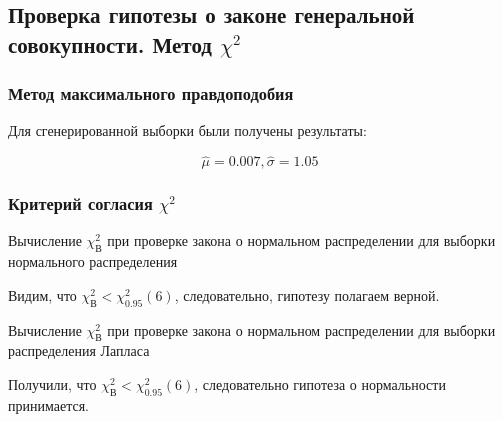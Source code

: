 \subsection{Проверка гипотезы о законе генеральной совокупности. Метод $\chi^2$}

\subsubsection{Метод максимального правдоподобия}

Для сгенерированной выборки были получены результаты:

$$\hat{\mu}=0.007, \hat{\sigma}=1.05$$

\subsubsection{Критерий согласия $\chi^2$}

\begin{table}[H]
	\begin{center}
		
		\caption{Вычисление $\chi_{\text{В}}^2$ при проверке закона о нормальном распределении для выборки нормального распределения}
	\end{center}
\end{table}

Видим, что $\chi_{\text{В}}^2 < \chi_{0.95}^2(6)$, следовательно, гипотезу полагаем верной.

\begin{table}[H]
	\begin{center}
		
		\caption{Вычисление $\chi_{\text{В}}^2$ при проверке закона о нормальном распределении
		для выборки распределения Лапласа}
	\end{center}
\end{table}

Получили, что $\chi_{\text{В}}^2 < \chi_{0.95}^2(6)$, следовательно гипотеза о нормальности принимается.